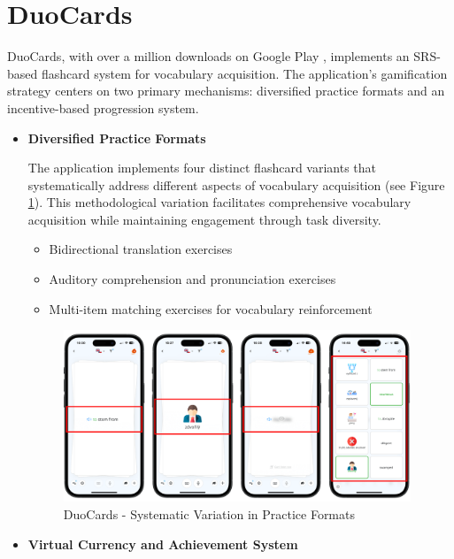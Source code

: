 \section{DuoCards}

DuoCards, with over a million downloads on Google Play \cite{cite:duocards_google_play}, implements an SRS-based flashcard system for vocabulary acquisition. The application's gamification strategy centers on two primary mechanisms: diversified practice formats and an incentive-based progression system.

\begin{itemize}
    \item \textbf{Diversified Practice Formats}

    The application implements four distinct flashcard variants that systematically address different aspects of vocabulary acquisition (see Figure \ref{fig:duocards-flashcard-types}). This methodological variation facilitates comprehensive vocabulary acquisition while maintaining engagement through task diversity.

    \begin{itemize} 
         \item Bidirectional translation exercises
         \item Auditory comprehension and pronunciation exercises
         \item Multi-item matching exercises for vocabulary reinforcement
    \end{itemize}

    \begin{figure}[!h]
        \includegraphics[width=0.98\textwidth]{src/figures/duocards-flashcard-types.png}
        \caption{DuoCards - Systematic Variation in Practice Formats}
        \label{fig:duocards-flashcard-types}
    \end{figure}
    
    \item \textbf{Virtual Currency and Achievement System}


\end{itemize}

